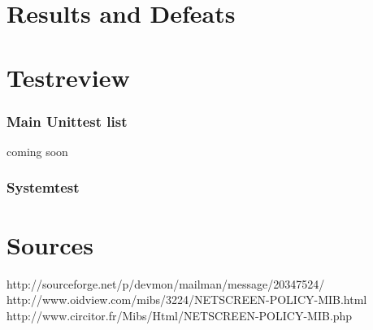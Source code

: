 \documentclass[a4paper,12pt]{scrreprt}
\begin{document}
\chapter{Results and Defeats}

\chapter{Testreview}
\subsection{Main Unittest list}
coming soon\\

\subsection{Systemtest}


\chapter{Sources}
http://sourceforge.net/p/devmon/mailman/message/20347524/
http://www.oidview.com/mibs/3224/NETSCREEN-POLICY-MIB.html
http://www.circitor.fr/Mibs/Html/NETSCREEN-POLICY-MIB.php
\end{document}

